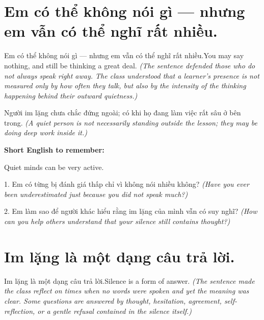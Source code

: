 \section{Em có thể không nói gì — nhưng em vẫn có thể nghĩ rất nhiều.}
\begin{truyen}{Em có thể không nói gì — nhưng em vẫn có thể nghĩ rất nhiều.}{You may say nothing, and still be thinking a great deal.}
\textit{(The sentence defended those who do not always speak right away. The class understood that a learner's presence is not measured only by how often they talk, but also by the intensity of the thinking happening behind their outward quietness.)}
\end{truyen}

\begin{baihoc}
Người im lặng chưa chắc đứng ngoài; có khi họ đang làm việc rất sâu ở bên trong.
\textit{(A quiet person is not necessarily standing outside the lesson; they may be doing deep work inside it.)}
\end{baihoc}

\begin{ghinhoanh}
\textbf{Short English to remember:}

Quiet minds can be very active.

\end{ghinhoanh}

\begin{tuhocnhanh}
1. Em có từng bị đánh giá thấp chỉ vì không nói nhiều không? \textit{(Have you ever been underestimated just because you did not speak much?)}

2. Em làm sao để người khác hiểu rằng im lặng của mình vẫn có suy nghĩ? \textit{(How can you help others understand that your silence still contains thought?)}
\end{tuhocnhanh}
\ngancach


\section{Im lặng là một dạng câu trả lời.}
\begin{truyen}{Im lặng là một dạng câu trả lời.}{Silence is a form of answer.}
\textit{(The sentence made the class reflect on times when no words were spoken and yet the meaning was clear. Some questions are answered by thought, hesitation, agreement, self-reflection, or a gentle refusal contained in the silence itself.)}
\end{truyen}

